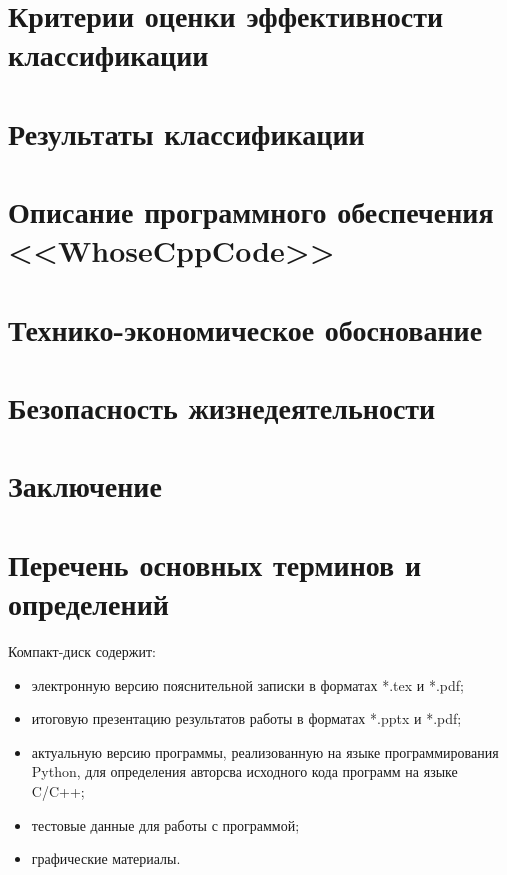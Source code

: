 \section{Критерии оценки эффективности классификации}\label{eval}

\newpage
\section{Результаты классификации}


\newpage
\section{Описание программного обеспечения <<WhoseCppCode>>}


% 

\clearpage
\section{Технико-экономическое обоснование}


\newpage
\section{Безопасность жизнедеятельности}

 
\newpage
\section*{Заключение}


\newpage
\section*{Перечень основных терминов и определений}

 
 
 \newpage
 \renewcommand{\refname}{Список использованных источников}
 

 Компакт-диск содержит: 
 \begin{itemize}
 \item электронную версию пояснительной записки в форматах *.tex и *.pdf;
 \item итоговую презентацию результатов работы в форматах *.pptx и *.pdf;
 \item актуальную версию программы, реализованную на языке программирования Python, для определения авторсва исходного кода программ на языке C/C++;
 \item тестовые данные для работы с программой;
 \item графические материалы.
 \end{itemize}
 
